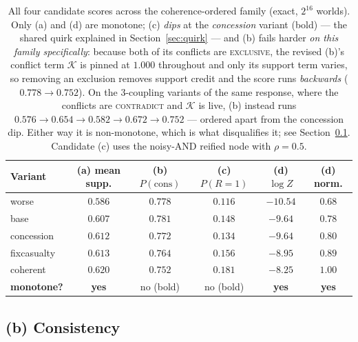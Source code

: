 \documentclass[11pt]{article}
\begin{document}
\begin{table}[h]\centering\small
\renewcommand{\arraystretch}{1.15}
\begin{tabular}{@{}lccccc@{}}
\toprule
\textbf{Variant} & (a) mean supp. & (b) $P(\text{cons})$ & (c) $P(R{=}1)$ & (d) $\log Z$ & (d) norm.\\
\midrule
worse        & $0.586$ & $\mathbf{0.778}$ & $0.116$ & $-10.54$ & $0.68$\\
base         & $0.607$ & $0.781$ & $0.148$ & $-9.64$  & $0.78$\\
concession   & $0.612$ & $\mathbf{0.772}$ & $\mathbf{0.134}$ & $-9.64$ & $0.80$\\
fixcasualty  & $0.613$ & $\mathbf{0.764}$ & $0.156$ & $-8.95$  & $0.89$\\
coherent     & $0.620$ & $\mathbf{0.752}$ & $0.181$ & $-8.25$  & $1.00$\\
\midrule
\textbf{monotone?} & \textbf{yes} & no (bold) & no (bold) & \textbf{yes} & \textbf{yes}\\
\bottomrule
\end{tabular}
\caption{All four candidate scores across the coherence-ordered family (exact, $2^{16}$
worlds). Only (a) and (d) are monotone; (c) \emph{dips} at the \emph{concession} variant
(bold) --- the shared quirk explained in Section~\ref{sec:quirk} --- and (b) fails harder
\emph{on this family specifically}: because both of its conflicts are \textsc{exclusive}, the
revised (b)'s conflict term $\mathcal K$ is pinned at $1.000$ throughout and only its support
term varies, so removing an exclusion removes support credit and the score runs \emph{backwards}
($0.778\to0.752$). On the 3-coupling variants of the same response, where the conflicts are
\textsc{contradict} and $\mathcal K$ is live, (b) instead runs
$0.576\to0.654\to\mathbf{0.582}\to0.672\to0.752$ --- ordered apart from the concession dip.
Either way it is non-monotone, which is what disqualifies it; see
Section~\ref{sec:consistency}. Candidate (c) uses the noisy-AND reified node with $\rho{=}0.5$.}
\label{tab:allcands}
\end{table}

\subsection{(b) Consistency}
\label{sec:consistency}
\end{document}
